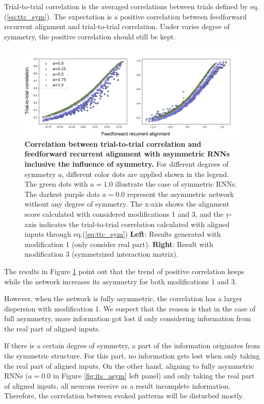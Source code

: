 \documentclass[11pt]{article}
\begin{document}
	Trial-to-trial correlation is the averaged correlations between trials defined by eq.(\ref{eq:ttc_sym}). The expectation is a positive correlation between feedforward recurrent alignment and trial-to-trial correlation. Under varies degree of symmetry, the positive correlation should still be kept.
		\begin{figure}[H]
			\centering
			\includegraphics[width = \textwidth]{../figures/ttc_asym.pdf}
			\caption{\textbf{Correlation between trial-to-trial correlation and feedforward recurrent alignment with asymmetric RNNs inclusive the influence of symmetry.} For different degrees of symmetry $a$, different color dots are applied shown in the legend. The green dots with $a=1.0$ illustrate the case of symmetric RNNs. The darkest purple dots $a=0.0$ represent the asymmetric network without any degree of symmetry. The x-axis shows the alignment score calculated with considered modifications 1 and 3, and the y-axis indicates the trial-to-trial correlation calculated with aligned inputs through eq.(\ref{eq:ttc_sym}) \textbf{Left}: Results generated with modification 1 (only consider real part). \textbf{Right}: Result with modification 3 (symmetrized interaction matrix).}
			\label{fig:ttc_asym}
		\end{figure}
	The results in Figure \ref{fig:ttc_asym} point out that the trend of positive correlation keeps while the network increases its asymmetry for both modifications 1 and 3. 
	
	However, when the network is fully asymmetric, the correlation has a larger dispersion with modification 1. We suspect that the reason is that in the case of full asymmetry, more information got lost if only considering information from the real part of aligned inputs. 
	
	If there is a certain degree of symmetry, a part of the information originates from the symmetric structure. For this part, no information gets lost when only taking the real part of aligned inputs. On the other hand, aligning to fully asymmetric RNNs ($a = 0.0$ in Figure \ref{fig:its_asym} left panel) and only taking the real part of aligned inputs, all neurons receive as a result incomplete information. Therefore, the correlation between evoked patterns will be disturbed mostly. 
	
\end{document}
